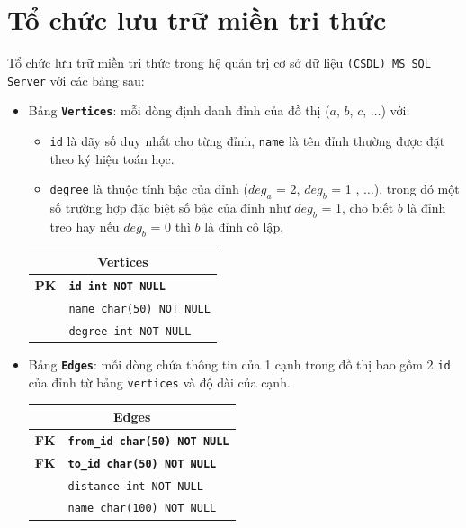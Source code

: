 \section{Tổ chức lưu trữ miền tri thức} 

Tổ chức lưu trữ miền tri thức trong hệ quản trị cơ sở dữ liệu \texttt{(CSDL) MS SQL Server} với các bảng sau:

\begin{itemize}
	\item Bảng \textbf{\texttt{Vertices}}: mỗi dòng định danh đỉnh của đồ thị ($a$, $b$, $c$, $\dots$) với:
	\begin{itemize}
		\item \texttt{id} là dãy số duy nhất cho từng đỉnh, \texttt{name} là tên đỉnh thường được đặt theo ký hiệu toán học.
		\item \texttt{degree} là thuộc tính bậc của đỉnh (${deg_a}$ = 2, ${deg_b}$ = 1 , $\dots$), trong đó một số trường hợp đặc biệt số bậc của đỉnh như ${deg_b}$ = 1, cho biết $b$ là đỉnh treo hay nếu ${deg_b}$ = 0 thì  $b$ là đỉnh cô lập.
	\end{itemize} 
	
	\begin{tabular}{|c|l|}
		\hline
		\multicolumn{2}{|c|}{\textbf{Vertices}} \\
		\hline
		\textbf{PK} & \texttt{\textbf{id int NOT NULL}} \\
		\hline
		& \texttt{name char(50) NOT NULL} \\
		\hline
		& \texttt{degree int NOT NULL} \\
		\hline
	\end{tabular}
	
	\item Bảng \textbf{\texttt{Edges}}: mỗi dòng chứa thông tin của 1 cạnh trong đồ thị bao gồm 2 \texttt{id} của đỉnh từ bảng \texttt{vertices} và độ dài của cạnh.
	
	\begin{tabular}{|c|l|}
		\hline
		\multicolumn{2}{|c|}{\textbf{Edges}} \\
		\hline
		\textbf{FK} & \texttt{\textbf{from\_id char(50) NOT NULL}} \\
		\hline
		\textbf{FK} & \texttt{\textbf{to\_id char(50) NOT NULL}} \\
		\hline
		& \texttt{distance int NOT NULL} \\
		\hline
		& \texttt{name char(100) NOT NULL} \\
		\hline
	\end{tabular}
\end{itemize}
	
